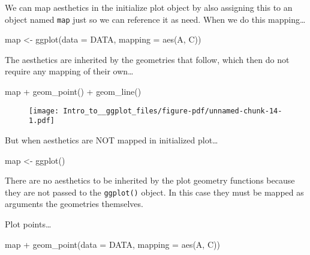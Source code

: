\documentclass[
  letterpaper,
  DIV=11,
  numbers=noendperiod]{scrartcl}
\newenvironment{Shaded}{\begin{snugshade}}{\end{snugshade}}
\newcommand{\AttributeTok}[1]{\textcolor[rgb]{0.40,0.45,0.13}{#1}}
\newcommand{\FunctionTok}[1]{\textcolor[rgb]{0.28,0.35,0.67}{#1}}
\newcommand{\NormalTok}[1]{\textcolor[rgb]{0.00,0.23,0.31}{#1}}
\newcommand{\OtherTok}[1]{\textcolor[rgb]{0.00,0.23,0.31}{#1}}
\newcommand{\SpecialCharTok}[1]{\textcolor[rgb]{0.37,0.37,0.37}{#1}}
\begin{document}
We can map aesthetics in the initialize plot object by also assigning
this to an object named \texttt{map} just so we can reference it as
need. When we do this mapping\ldots{}

\begin{Shaded}
\begin{Highlighting}[]
\NormalTok{map }\OtherTok{\textless{}{-}} \FunctionTok{ggplot}\NormalTok{(}\AttributeTok{data =}\NormalTok{ DATA, }
              \AttributeTok{mapping =} \FunctionTok{aes}\NormalTok{(A, C))}
\end{Highlighting}
\end{Shaded}

The aesthetics are inherited by the geometries that follow, which then
do not require any mapping of their own\ldots{}

\begin{Shaded}
\begin{Highlighting}[]
\NormalTok{map }\SpecialCharTok{+} 
  \FunctionTok{geom\_point}\NormalTok{() }\SpecialCharTok{+} 
  \FunctionTok{geom\_line}\NormalTok{()}
\end{Highlighting}
\end{Shaded}

\begin{figure}[H]

{\centering \texttt{[image: Intro\_to\_\_ggplot\_files/figure-pdf/unnamed-chunk-14-1.pdf]}

}

\end{figure}

But when aesthetics are NOT mapped in initialized plot\ldots{}

\begin{Shaded}
\begin{Highlighting}[]
\NormalTok{map }\OtherTok{\textless{}{-}} \FunctionTok{ggplot}\NormalTok{() }
\end{Highlighting}
\end{Shaded}

There are no aesthetics to be inherited by the plot geometry functions
because they are not passed to the \texttt{ggplot()} object. In this
case they must be mapped as arguments the geometries themselves.

Plot points\ldots{}

\begin{Shaded}
\begin{Highlighting}[]
\NormalTok{map }\SpecialCharTok{+} 
  \FunctionTok{geom\_point}\NormalTok{(}\AttributeTok{data =}\NormalTok{ DATA, }
             \AttributeTok{mapping =} \FunctionTok{aes}\NormalTok{(A, C)) }
\end{Highlighting}
\end{Shaded}
\end{document}
